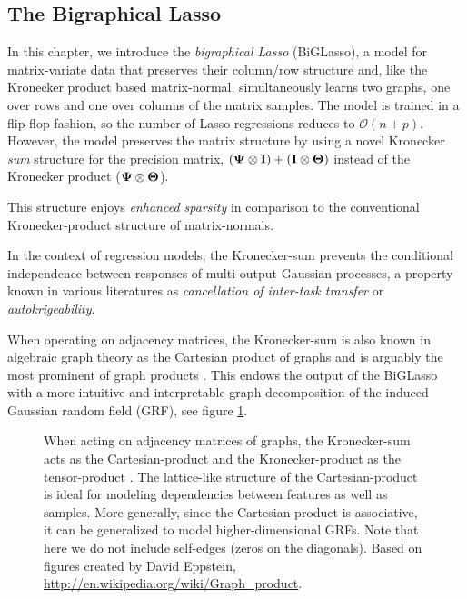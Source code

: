     \subsection{The Bigraphical Lasso}
    
      In this chapter, we introduce the \emph{bigraphical Lasso} (BiGLasso), a model for matrix-variate data that preserves their column/row structure and, like the Kronecker product based matrix-normal, simultaneously learns two graphs, one over rows and one over columns of the matrix samples.
      The model is trained in a flip-flop fashion, so the number of Lasso regressions reduces to $\mathcal{O}(n+p)$.
      However, the model preserves the matrix structure by using a novel Kronecker \emph{sum} structure for the precision matrix, $(\mathbf{\Psi} \otimes \mathbf{I}) + (\mathbf{I} \otimes \mathbf{\Theta})$ instead of the Kronecker product ($\mathbf{\Psi} \otimes \mathbf{\Theta}$).
      {\color{black} This structure enjoys \emph{enhanced sparsity} in comparison to the conventional Kronecker-product structure of matrix-normals.
    
      In the context of regression models, the Kronecker-sum prevents the conditional independence between responses of multi-output Gaussian processes, a property known in various literatures as \emph{cancellation of inter-task transfer} or \emph{autokrigeability}.}
    
      When operating on adjacency matrices, the Kronecker-sum is also known in algebraic graph theory as the Cartesian product of graphs {\color{black} and is arguably the most prominent of graph products \citep{Sabidussi:graph59, Chung:Spectral96, Imrich:TopicsInGT08}}.
      This endows the output of the BiGLasso with a more intuitive and interpretable graph decomposition of the induced Gaussian random field (GRF), see figure \ref{fig:graph_products}.
      \begin{figure}[!htbp]
        \centering
        \hfill
        \caption[Cartesian and tensor product of graphs.]{ \label{fig:graph_products}
          When acting on adjacency matrices of graphs, the Kronecker-sum acts as the Cartesian-product  and the Kronecker-product as the tensor-product .
          The lattice-like structure of the Cartesian-product is ideal for modeling dependencies between features as well as samples.
          More generally, since the Cartesian-product is associative, it can be generalized to model higher-dimensional GRFs.
          Note that here we do not include self-edges (zeros on the diagonals).
          Based on figures created by David Eppstein, \url{http://en.wikipedia.org/wiki/Graph_product}.
        }
      \end{figure}
    
